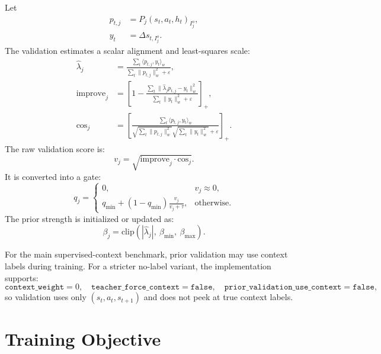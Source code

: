 \documentclass[11pt]{article}
\newcommand{\clip}{\mathrm{clip}}
\begin{document}
Let
\begin{align}
    p_{t,j} &= P_j(s_t,a_t,h_t)_{I^o_j}, \\
    y_t &= \Delta s_{t,I^o_j}.
\end{align}
The validation estimates a scalar alignment and least-squares scale:
\begin{align}
    \hat \lambda_j
    &=
    \frac{\sum_t \langle p_{t,j}, y_t\rangle_w}
         {\sum_t \|p_{t,j}\|^2_w + \varepsilon}, \\
    \mathrm{improve}_j
    &=
    \left[
    1 -
    \frac{\sum_t \|\hat\lambda_j p_{t,j}-y_t\|^2_w}
         {\sum_t \|y_t\|^2_w+\varepsilon}
    \right]_+, \\
    \mathrm{cos}_j
    &=
    \left[
    \frac{\sum_t \langle p_{t,j},y_t\rangle_w}
         {\sqrt{\sum_t\|p_{t,j}\|^2_w}\sqrt{\sum_t\|y_t\|^2_w}+\varepsilon}
    \right]_+.
\end{align}
The raw validation score is:
\begin{equation}
    v_j = \sqrt{\mathrm{improve}_j \cdot \mathrm{cos}_j}.
\end{equation}
It is converted into a gate:
\begin{equation}
    q_j =
    \begin{cases}
        0, & v_j \approx 0, \\
        q_{\min} + (1-q_{\min})\frac{v_j}{v_j+\tau}, & \text{otherwise}.
    \end{cases}
\end{equation}
The prior strength is initialized or updated as:
\begin{equation}
    \beta_j = \clip(|\hat\lambda_j|,\ \beta_{\min},\ \beta_{\max}).
\end{equation}

For the main supervised-context benchmark, prior validation may use context labels during training. For a stricter no-label variant, the implementation supports:
\begin{equation}
    \texttt{context\_weight}=0,\quad
    \texttt{teacher\_force\_context}=\texttt{false},\quad
    \texttt{prior\_validation\_use\_context}=\texttt{false},
\end{equation}
so validation uses only $(s_t,a_t,s_{t+1})$ and does not peek at true context labels.

\section{Training Objective}
\end{document}
